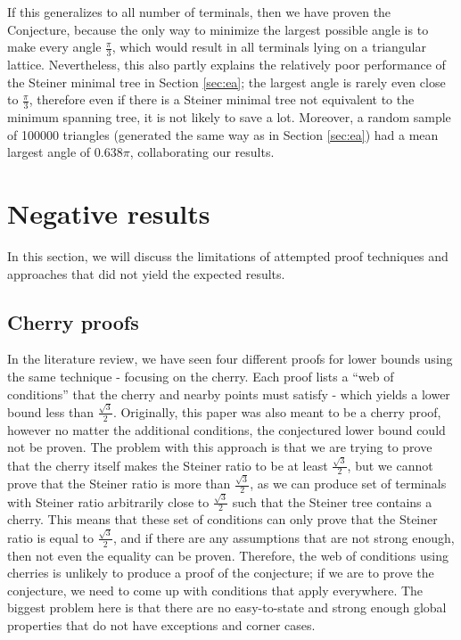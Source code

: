 \documentclass{mpaper}
\begin{document}
If this generalizes to all number of terminals, then we have proven the Conjecture, because the only way to minimize the largest possible angle is to make every angle $\frac{\pi}{3}$, which would result in all terminals lying on a triangular lattice. Nevertheless, this also partly explains the relatively poor performance of the Steiner minimal tree in Section \ref{sec:ea}; the largest angle is rarely even close to $\frac{\pi}{3}$, therefore even if there is a Steiner minimal tree not equivalent to the minimum spanning tree, it is not likely to save a lot. Moreover, a random sample of 100000 triangles (generated the same way as in Section \ref{sec:ea}) had a mean largest angle of $0.638\pi$, collaborating our results.



\section{Negative results} \label{sec:other}
In this section, we will discuss the limitations of attempted proof techniques and approaches that did not yield the expected results.

\subsection{Cherry proofs}

In the literature review, we have seen four different proofs for lower bounds using the same technique - focusing on the cherry. Each proof lists a ``web of conditions'' that the cherry and nearby points must satisfy - which yields a lower bound less than $\frac{\sqrt{3}}{2}$. Originally, this paper was also meant to be a cherry proof, however no matter the additional conditions, the conjectured lower bound could not be proven. The problem with this approach is that we are trying to prove that the cherry itself makes the Steiner ratio to be at least $\frac{\sqrt{3}}{2}$, but we cannot prove that the Steiner ratio is more than  $\frac{\sqrt{3}}{2}$, as we can produce set of terminals with Steiner ratio arbitrarily close to $\frac{\sqrt{3}}{2}$ such that the Steiner tree contains a cherry. This means that  these set of conditions can only prove that the Steiner ratio is equal to  $\frac{\sqrt{3}}{2}$, and if there are any assumptions that are not strong enough, then not even the equality can be proven. Therefore, the web of conditions using cherries is unlikely to produce a proof of the conjecture; if we are to prove the conjecture, we need to come up with conditions that apply everywhere. The biggest problem here is that there are no easy-to-state and strong enough global properties that do not have exceptions and corner cases.
\end{document}
